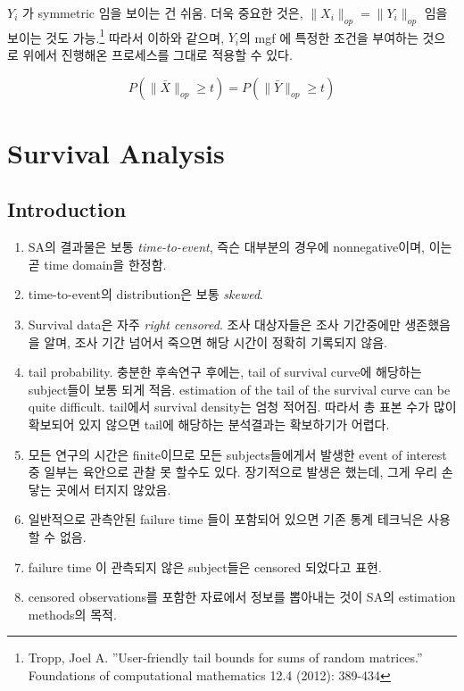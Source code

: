 \documentclass[
]{book}
\begin{document}
{{{\(Y_i\) 가 symmetric 임을 보이는 건 쉬움. 더욱 중요한 것은, \(\|X_i \|_{op} = \|Y_i \|_{op}\) 임을 보이는 것도 가능.\footnote{Tropp, Joel A. ''User-friendly tail bounds for sums of random matrices.'' Foundations of computational mathematics 12.4 (2012): 389-434} 따라서 이하와 같으며, \(Y_i\)의 mgf 에 특정한 조건을 부여하는 것으로 위에서 진행해온 프로세스를 그대로 적용할 수 있다.

\[
P(\| \bar X \|_{op} \ge t)= P(\| \bar Y \|_{op} \ge t) 
\]

\hypertarget{survival-analysis}{%
\chapter{Survival Analysis}\label{survival-analysis}}

\hypertarget{introduction-4}{%
\section{Introduction}\label{introduction-4}}

\begin{enumerate}
\def\labelenumi{\arabic{enumi}.}
\item
  SA의 결과물은 보통 \emph{time-to-event}, 즉슨 대부분의 경우에 nonnegative이며, 이는 곧 time domain을 한정함.
\item
  time-to-event의 distribution은 보통 \emph{skewed}.
\item
  Survival data은 자주 \emph{right censored}. 조사 대상자들은 조사 기간중에만 생존했음을 알며, 조사 기간 넘어서 죽으면 해당 시간이 정확히 기록되지 않음.
\item
  tail probability. 충분한 후속연구 후에는, tail of survival curve에 해당하는 subject들이 보통 되게 적음. estimation of the tail of the survival curve can be quite difficult. tail에서 survival density는 엄청 적어짐. 따라서 총 표본 수가 많이 확보되어 있지 않으면 tail에 해당하는 분석결과는 확보하기가 어렵다.
\item
  모든 연구의 시간은 finite이므로 모든 subjects들에게서 발생한 event of interest 중 일부는 육안으로 관찰 못 할수도 있다. 장기적으로 발생은 했는데, 그게 우리 손닿는 곳에서 터지지 않았음.
\item
  일반적으로 관측안된 failure time 들이 포함되어 있으면 기존 통계 테크닉은 사용할 수 없음.
\item
  failure time 이 관측되지 않은 subject들은 censored 되었다고 표현.
\item
  censored observations를 포함한 자료에서 정보를 뽑아내는 것이 SA의 estimation methods의 목적.
\end{enumerate}

}}}
\end{document}
